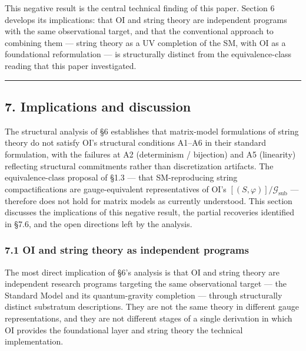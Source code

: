\documentclass[
]{article}
\begin{document}
This negative result is the central technical finding of this paper.
Section 6 develops its implications: that OI and string theory are
independent programs with the same observational target, and that the
conventional approach to combining them --- string theory as a UV
completion of the SM, with OI as a foundational reformulation --- is
structurally distinct from the equivalence-class reading that this paper
investigated.

\begin{center}\rule{0.5\linewidth}{0.5pt}\end{center}

\hypertarget{implications-and-discussion}{%
\subsection{7. Implications and
discussion}\label{implications-and-discussion}}

The structural analysis of §6 establishes that matrix-model formulations
of string theory do not satisfy OI's structural conditions A1--A6 in
their standard formulation, with the failures at A2 (determinism /
bijection) and A5 (linearity) reflecting structural commitments rather
than discretization artifacts. The equivalence-class proposal of §1.3
--- that SM-reproducing string compactifications are gauge-equivalent
representatives of OI's \([(S, \varphi)]/\mathcal{G}_{\text{sub}}\) ---
therefore does not hold for matrix models as currently understood. This
section discusses the implications of this negative result, the partial
recoveries identified in §7.6, and the open directions left by the
analysis.

\hypertarget{oi-and-string-theory-as-independent-programs}{%
\subsubsection{7.1 OI and string theory as independent
programs}\label{oi-and-string-theory-as-independent-programs}}

The most direct implication of §6's analysis is that OI and string
theory are independent research programs targeting the same
observational target --- the Standard Model and its quantum-gravity
completion --- through structurally distinct substratum descriptions.
They are not the same theory in different gauge representations, and
they are not different stages of a single derivation in which OI
provides the foundational layer and string theory the technical
implementation.
\end{document}
